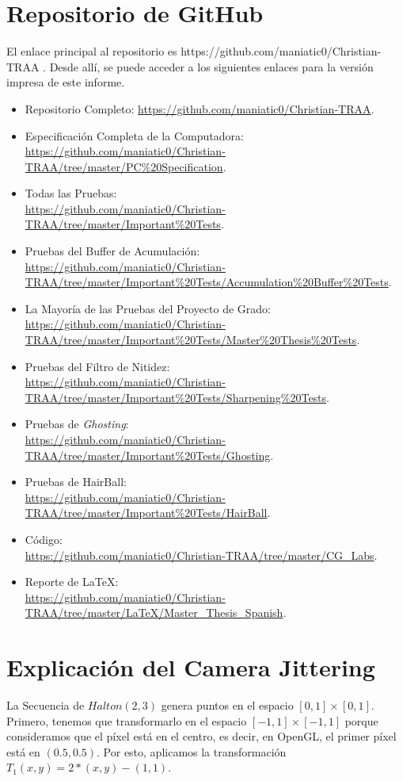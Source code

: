 \documentclass[pregrado]{tesis-usb} %
\begin{document}
\chapter{Repositorio de GitHub}
El enlace principal al repositorio es https://github.com/maniatic0/Christian-TRAA . Desde allí, se puede acceder a los siguientes enlaces para la versión impresa de este informe.
\begin{itemize}
	\item Repositorio Completo: \url{https://github.com/maniatic0/Christian-TRAA}.
	\item Especificación Completa de la Computadora: \\ \url{https://github.com/maniatic0/Christian-TRAA/tree/master/PC%20Specification}.
	\item Todas las Pruebas: \\ \url{https://github.com/maniatic0/Christian-TRAA/tree/master/Important%20Tests}.
	\item Pruebas del Buffer de Acumulación: \\ \url{https://github.com/maniatic0/Christian-TRAA/tree/master/Important%20Tests/Accumulation%20Buffer%20Tests}.
	\item La Mayoría de las Pruebas del Proyecto de Grado: \\ \url{https://github.com/maniatic0/Christian-TRAA/tree/master/Important%20Tests/Master%20Thesis%20Tests}.
	\item Pruebas del Filtro de Nitidez: \\ \url{https://github.com/maniatic0/Christian-TRAA/tree/master/Important%20Tests/Sharpening%20Tests}.
	\item Pruebas de \textit{Ghosting}: \\ \url{https://github.com/maniatic0/Christian-TRAA/tree/master/Important%20Tests/Ghosting}.
	\item Pruebas de HairBall: \\ \url{https://github.com/maniatic0/Christian-TRAA/tree/master/Important%20Tests/HairBall}.
	\item Código: \\ \url{https://github.com/maniatic0/Christian-TRAA/tree/master/CG_Labs}.
	\item Reporte de \LaTeX: \\ \url{https://github.com/maniatic0/Christian-TRAA/tree/master/LaTeX/Master_Thesis_Spanish}.
\end{itemize}
\chapter{Explicación del Camera Jittering} \label{appendix:jitter}
La Secuencia de $Halton(2, 3)$ genera puntos en el espacio $[0,1] \times [0,1]$. Primero, tenemos que transformarlo en el espacio $[- 1,1] \times [-1,1]$ porque consideramos que el píxel está en el centro, es decir, en OpenGL, el primer píxel está en $(0.5, 0.5)$. Por esto, aplicamos la transformación $T_1 (x, y) = 2 * (x, y) - (1, 1)$.
\end{document}
